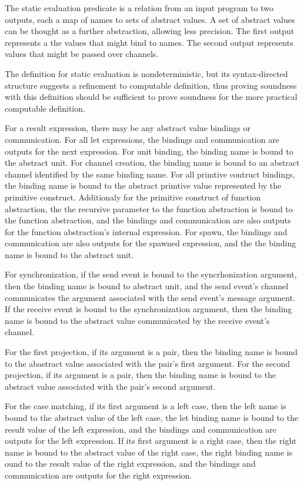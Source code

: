 \documentclass{article}
\begin{document}
The static evaluation predicate is a relation from an input program to two outputs, each a map of names to sets of abstract values.  A set of abstract values can be thought as a further abstraction, allowing less precision.
The first output represents a the values that might bind to names.  The second output represents values that might be passed over channels.

The definition for static evaluation is nondeterministic, but its syntax-directed structure suggests a refinement to computable definition, thus proving soundness with this definition should be sufficient to prove soundness for the more practical computable definition.

For a result expression, there may be any abstract value bindings or communication.
For all let expressions, the bindings and communication are outputs for the next expression. 
For unit binding, the binding name is bound to the abstract unit. 
For channel creation, the binding name is bound to an abstract channel identified by the same binding name. 
For all primtive contruct bindings, the binding name is bound to the abstract primtive value represented by the primitive construct.  Additionaly for the primitive construct of function abstraction, the the recursive parameter to the function abstraction is bound to the function abstraction, and the bindings and communication are also outputs for the function abstraction's internal expression.  
For spawn, the bindings and communication are also outputs for the spawned expression, and the the binding name is bound to the abstract unit.

For synchronization, if the send event is bound to the syncrhonization argument, then the binding name is bound to abstract unit, and the send event's channel communicates the argument associated with the send event's message argument.  If the receive event is bound to the synchronization argument, then the binding name is bound to the abstract value communicated by the receive event's channel.

For the first projection, if its argument is a pair, then the binding name is bound to the abastract value associated with the pair's first argument.  For the second projection, if its argument is a pair, then the binding name is bound to the abstract value associated with the pair's second argument.  

For the case matching, if its first argument is a left case, then the left name is bound to the abstract value of the left case, the let binding name is bound to the result value of the left expression, and the bindings and communication are outputs for the left expression.  If its first argument is a right case, then the right name is bound to the abstract value of the right case, the right binding name is ound to the result value of the right expression, and the bindings and communication are outputs for the right expression. 
\end{document}
